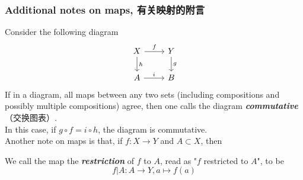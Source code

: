 \subsubsection{Additional notes on maps, 有关映射的附言}
Consider the following diagram \\
$$\begin{tikzcd}
    X \arrow[r, "f"] \arrow[d, "h"]
        & Y \arrow[d, "g"] \\
    A \arrow [r, "i"]
        & B
\end{tikzcd}$$
If in a diagram, all maps between any two sets (including compositions and possibly multiple compositions) agree, then one calls the diagram \textbf{\textit{commutative}}（交换图表）. \\
In this case, if $g \circ f = i \circ h$, the diagram is commutative. \\
Another note on maps is that, if $f: X \to Y$ and $A \subset X$, then
\begin{definition}
    We call the map the \textbf{\textit{restriction}} of $f$ to $A$, read as "$f$ restricted to $A$", to be
    $$f|A: A \to Y, a \mapsto f(a)$$
\end{definition}
\newpage